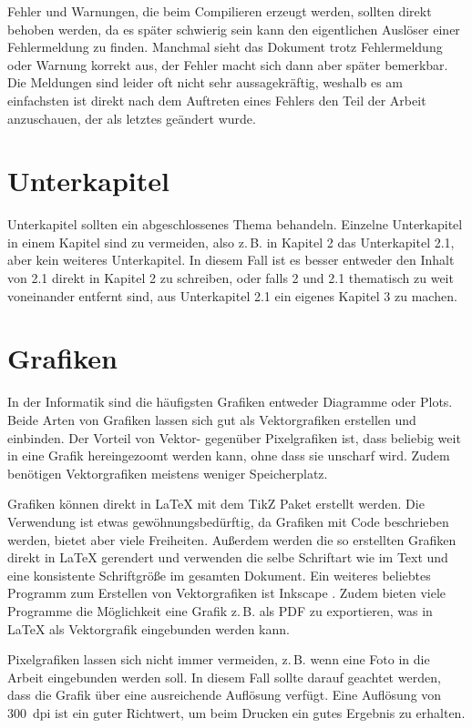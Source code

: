 Fehler und Warnungen, die beim Compilieren erzeugt werden, sollten direkt behoben werden, da es später schwierig sein kann den eigentlichen Auslöser einer Fehlermeldung zu finden. Manchmal sieht das Dokument trotz Fehlermeldung oder Warnung korrekt aus, der Fehler macht sich dann aber später bemerkbar. Die Meldungen sind leider oft nicht sehr aussagekräftig, weshalb es am einfachsten ist direkt nach dem Auftreten eines Fehlers den Teil der Arbeit anzuschauen, der als letztes geändert wurde.

\section{Unterkapitel}
Unterkapitel sollten ein abgeschlossenes Thema behandeln. Einzelne Unterkapitel in einem Kapitel sind zu vermeiden, also z.\,B. in Kapitel 2 das Unterkapitel 2.1, aber kein weiteres Unterkapitel. In diesem Fall ist es besser entweder den Inhalt von 2.1 direkt in Kapitel 2 zu schreiben, oder falls 2 und 2.1 thematisch zu weit voneinander entfernt sind, aus Unterkapitel 2.1 ein eigenes Kapitel 3 zu machen.

\section{Grafiken}
In der Informatik sind die häufigsten Grafiken entweder Diagramme oder Plots. Beide Arten von Grafiken lassen sich gut als Vektorgrafiken erstellen und einbinden. Der Vorteil von Vektor- gegenüber Pixelgrafiken ist, dass beliebig weit in eine Grafik hereingezoomt werden kann, ohne dass sie unscharf wird. Zudem benötigen Vektorgrafiken meistens weniger Speicherplatz.

Grafiken können direkt in \LaTeX{} mit dem TikZ Paket \cite{tikz} erstellt werden. Die Verwendung ist etwas gewöhnungsbedürftig, da Grafiken mit Code beschrieben werden, bietet aber viele Freiheiten. Außerdem werden die so erstellten Grafiken direkt in \LaTeX{} gerendert und verwenden die selbe Schriftart wie im Text und eine konsistente Schriftgröße im gesamten Dokument. Ein weiteres beliebtes Programm zum Erstellen von Vektorgrafiken ist Inkscape \cite{inkscape}. Zudem bieten viele Programme die Möglichkeit eine Grafik z.\,B. als PDF zu exportieren, was in \LaTeX{} als Vektorgrafik eingebunden werden kann.

Pixelgrafiken lassen sich nicht immer vermeiden, z.\,B. wenn eine Foto in die Arbeit eingebunden werden soll. In diesem Fall sollte darauf geachtet werden, dass die Grafik über eine ausreichende Auflösung verfügt. Eine Auflösung von 300~dpi ist ein guter Richtwert, um beim Drucken ein gutes Ergebnis zu erhalten.

